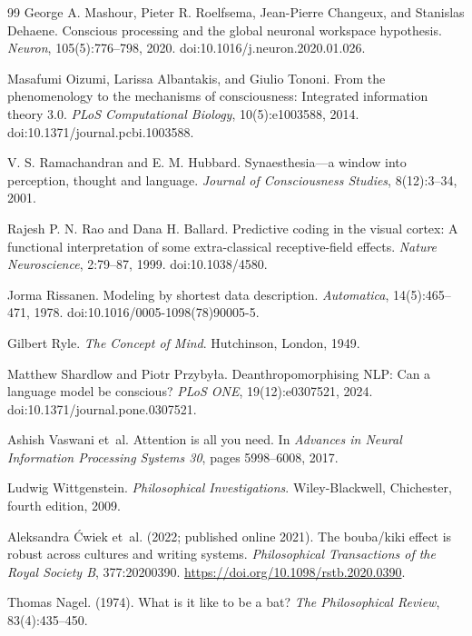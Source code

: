 \documentclass[11pt,a4paper]{article}
\theoremstyle{remark}\newtheorem{remark}[definition]{Remark}
\begin{document}
\begin{thebibliography}{99}
George A. Mashour, Pieter R. Roelfsema, Jean-Pierre Changeux, and Stanislas Dehaene.
\newblock Conscious processing and the global neuronal workspace hypothesis.
\newblock \emph{Neuron}, 105(5):776--798, 2020.
\newblock doi:10.1016/j.neuron.2020.01.026.

Masafumi Oizumi, Larissa Albantakis, and Giulio Tononi.
\newblock From the phenomenology to the mechanisms of consciousness: Integrated information theory 3.0.
\newblock \emph{PLoS Computational Biology}, 10(5):e1003588, 2014.
\newblock doi:10.1371/journal.pcbi.1003588.

V. S. Ramachandran and E. M. Hubbard.
\newblock Synaesthesia---a window into perception, thought and language.
\newblock \emph{Journal of Consciousness Studies}, 8(12):3--34, 2001.

Rajesh P. N. Rao and Dana H. Ballard.
\newblock Predictive coding in the visual cortex: A functional interpretation of some extra-classical receptive-field effects.
\newblock \emph{Nature Neuroscience}, 2:79--87, 1999.
\newblock doi:10.1038/4580.

Jorma Rissanen.
\newblock Modeling by shortest data description.
\newblock \emph{Automatica}, 14(5):465--471, 1978.
\newblock doi:10.1016/0005-1098(78)90005-5.

Gilbert Ryle.
\newblock \emph{The Concept of Mind}.
\newblock Hutchinson, London, 1949.

Matthew Shardlow and Piotr Przyby\l{}a.
\newblock Deanthropomorphising NLP: Can a language model be conscious?
\newblock \emph{PLoS ONE}, 19(12):e0307521, 2024.
\newblock doi:10.1371/journal.pone.0307521.

Ashish Vaswani et~al.
\newblock Attention is all you need.
\newblock In \emph{Advances in Neural Information Processing Systems 30}, pages 5998--6008, 2017.

Ludwig Wittgenstein.
\newblock \emph{Philosophical Investigations}.
\newblock Wiley-Blackwell, Chichester, fourth edition, 2009.

Aleksandra \'Cwiek et~al. (2022; published online 2021).
The bouba/kiki effect is robust across cultures and writing systems.
\emph{Philosophical Transactions of the Royal Society B}, 377:20200390.
\url{https://doi.org/10.1098/rstb.2020.0390}.

Thomas Nagel. (1974). What is it like to be a bat?
\emph{The Philosophical Review}, 83(4):435--450.

\end{thebibliography}
\end{document}

